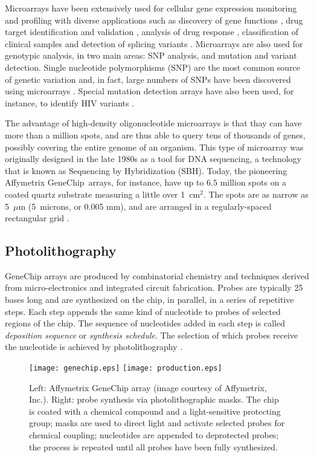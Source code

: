 Microarrays have been extensively used for cellular gene expression monitoring
and profiling \citep{Schena1995,Lockhart1996} with diverse applications such as
discovery of gene functions \citep{Cho1998,Hughes2000}, drug target
identification and validation \citep{Marton1998,Liotta2000}, analysis of drug
response \citep{Debouck1999}, classification of clinical samples
\citep{Perou1999} and detection of splicing variants \citep{Hu2001}. Microarrays
are also used for genotypic analysis, in two main areas: SNP analysis, and
mutation and variant detection. Single nucleotide polymorphisms (SNP) are the
most common source of genetic variation and, in fact, large numbers of SNPs have
been discovered using microarrays \citep{Lindblad-Toh2000}. Special mutation
detection arrays have also been used, for instance, to identify HIV variants
\citep{Kozal1996}.

The advantage of high-density oligonucleotide microarrays is that thay can have
more than a million spots, and are thus able to query tens of thousands of
genes, possibly covering the entire genome of an organism. This type of
microarray was originally designed in the late 1980s as a tool for DNA
sequencing, a technology that is known as Sequencing by Hybridization (SBH).
Today, the pioneering Affymetrix GeneChip\textR\ arrays, for instance, have up
to $6.5$ million spots on a coated quartz substrate measuring a little over
1~cm$^2$. The spots are as narrow as 5~$\mu$m (5~microns, or 0.005 mm), and are
arranged in a regularly-spaced rectangular grid \citep{McGall2002}.

\subsection{Photolithography}

GeneChip arrays are produced by combinatorial chemistry and techniques derived
from micro-electronics and integrated circuit fabrication. Probes are typically
25 bases long and are synthesized on the chip, in parallel, in a series of
repetitive steps. Each step appends the same kind of nucleotide to probes of
selected regions of the chip. The sequence of nucleotides added in each step is
called \emph{deposition sequence} or \emph{synthesis schedule}. The selection of
which probes receive the nucleotide is achieved by photolithography
\citep{Fodor1991,Fodor1993,Lipshutz1999}.

\begin{figure}[t]\centering
\texttt{[image: genechip.eps]}
\hfill
\texttt{[image: production.eps]}
\caption{Left: Affymetrix GeneChip array (image courtesy of Affymetrix, Inc.).
  Right: probe synthesis via photolithographic masks. The chip is coated with a
  chemical compound and a light-sensitive protecting group; masks are used to
  direct light and activate selected probes for chemical coupling; nucleotides
  are appended to deprotected probes; the process is repeated until all probes
  have been fully synthesized.}
\label{fig:photolithography}
\end{figure}

